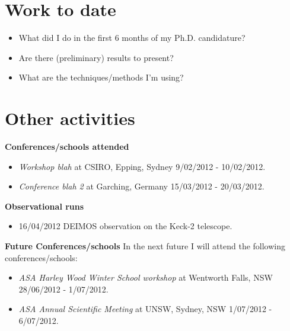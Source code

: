 \documentclass[useAMS,usenatbib,onecolumn]{mn2e}
\begin{document}
\section{Work to date}

\begin{itemize}
	\item{What did I do in the first 6 months of my Ph.D. candidature?}
	\item{Are there (preliminary) results to present?}
	\item{What are the techniques/methods I'm using?}
\end{itemize}

\section{Other activities}

	\noindent\textbf{Conferences/schools attended}
	\begin{itemize}
  		\item{\textit{Workshop blah}} at CSIRO, Epping, Sydney 9/02/2012 - 10/02/2012. 
  		\item{\textit{Conference blah 2}} at Garching, Germany 15/03/2012 - 20/03/2012. 
	\end{itemize}

	\textbf{Observational runs}
	\begin{itemize}
		\item{16/04/2012} DEIMOS observation on the Keck-2 telescope.
	\end{itemize}

	\textbf{Future Conferences/schools}
	In the next future I will attend the following conferences/schools:
	\begin{itemize}
		\item{\textit{ASA Harley Wood Winter School workshop}} at Wentworth Falls, NSW 28/06/2012 - 1/07/2012.
		\item{\textit{ASA Annual Scientific Meeting}} at UNSW, Sydney, NSW 1/07/2012 - 6/07/2012.
	\end{itemize}


\end{document}
